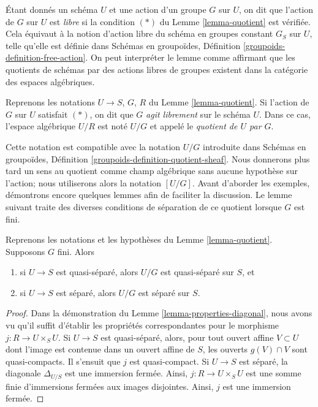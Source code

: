 \noindent
Étant donnés un schéma $U$ et une action d'un groupe $G$ sur $U$, on dit que l'action
de $G$ sur $U$ est {\it libre} si la condition $(*)$ du Lemme \ref{lemma-quotient}
est vérifiée. Cela équivaut à la notion d'action libre du schéma en groupes
constant $G_S$ sur $U$, telle qu'elle est définie dans
Schémas en groupoïdes, Définition \ref{groupoids-definition-free-action}.
On peut interpréter le lemme comme affirmant que les quotients de schémas par des
actions libres de groupes existent dans la catégorie des espaces algébriques.

\begin{definition}
\label{definition-quotient}
Reprenons les notations $U \to S$, $G$, $R$ du Lemme \ref{lemma-quotient}.
Si l'action de $G$ sur $U$ satisfait $(*)$, on dit que $G$ {\it agit librement}
sur le schéma $U$. Dans ce cas, l'espace algébrique $U/R$ est noté
$U/G$ et appelé le {\it quotient de $U$ par $G$}.
\end{definition}

\noindent
Cette notation est compatible avec la notation $U/G$ introduite dans
Schémas en groupoïdes, Définition \ref{groupoids-definition-quotient-sheaf}.
Nous donnerons plus tard un sens au quotient comme champ algébrique sans
aucune hypothèse sur l'action; nous utiliserons alors la
notation $[U/G]$. Avant d'aborder les exemples, démontrons
encore quelques lemmes afin de faciliter la discussion. Le lemme suivant traite des
diverses conditions de séparation de ce quotient lorsque $G$ est fini.

\begin{lemma}
\label{lemma-quotient-finite-separated}
Reprenons les notations et les hypothèses du Lemme \ref{lemma-quotient}.
Supposons $G$ fini. Alors
\begin{enumerate}
\item si $U \to S$ est quasi-séparé, alors $U/G$ est quasi-séparé
sur $S$, et
\item si $U \to S$ est séparé, alors $U/G$ est séparé sur $S$.
\end{enumerate}
\end{lemma}

\begin{proof}
Dans la démonstration du Lemme \ref{lemma-properties-diagonal},
nous avons vu qu'il suffit d'établir les
propriétés correspondantes pour le morphisme $j : R \to U \times_S U$.
Si $U \to S$ est quasi-séparé, alors, pour tout ouvert affine $V \subset U$
dont l'image est contenue dans un ouvert affine de $S$,
les ouverts $g(V) \cap V$ sont quasi-compacts. Il s'ensuit que $j$ est
quasi-compact.
Si $U \to S$ est séparé, la diagonale $\Delta_{U/S}$ est une immersion
fermée. Ainsi, $j : R \to U \times_S U$ est une somme finie
d'immersions fermées aux images disjointes. Ainsi, $j$ est une immersion fermée.
\end{proof}

